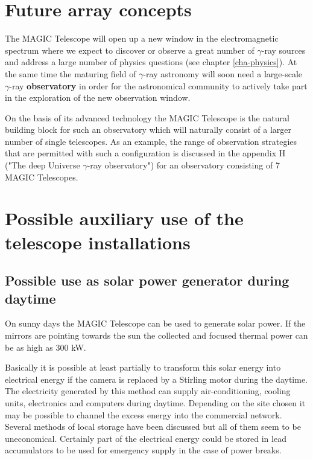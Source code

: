 \chapter{Future array concepts}


\medskip
The MAGIC Telescope will open up a new window in the electromagnetic spectrum
where we expect to discover or observe a great number
of  $\gamma$-ray sources and address a large number of physics questions
(see chapter \ref{cha-physics}).
At the same time the maturing field of $\gamma$-ray astronomy will soon
need a large-scale $\gamma$-ray {\bf observatory} in order for the
astronomical community to actively take part in the exploration of
the new observation window.

On the basis of its advanced technology the MAGIC Telescope
is the natural building block for such an observatory
which will naturally consist of a larger number of single
telescopes. As an example, the range of observation strategies that are permitted
with such a configuration is  discussed in the appendix H ("The deep Universe
$\gamma$-ray observatory") for an observatory consisting of 7 MAGIC Telescopes.
\cleardoublepage

\chapter{Possible auxiliary use of the telescope installations}

\section{Possible use as solar power generator during daytime}


\medskip On sunny days the MAGIC Telescope can be used to generate solar
power. If the mirrors are pointing towards the sun the collected and focused
thermal power can be as high as 300 kW.

Basically it is possible at least partially to transform this solar energy
into electrical energy if the camera is replaced by a Stirling motor during
the daytime. The electricity generated by this method can supply
air-conditioning, cooling units, electronics and computers during daytime.
Depending on the site chosen it may be possible to channel the excess energy
into the commercial network. Several methods of local storage have been
discussed but all of them seem to be uneconomical. Certainly part of the
electrical energy could be stored in lead accumulators to be used for
emergency supply in the case of power breaks.

